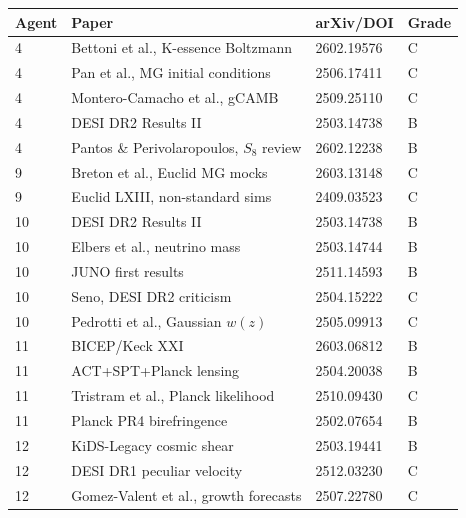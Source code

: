 \documentclass[11pt]{article}
\begin{document}
\begin{longtable}{p{}p{}p{}p{}}
\toprule
\textbf{Agent} & \textbf{Paper} & \textbf{arXiv/DOI} & \textbf{Grade} \\
\midrule
\endhead
4 & Bettoni et al., K-essence Boltzmann & 2602.19576 & C \\
4 & Pan et al., MG initial conditions & 2506.17411 & C \\
4 & Montero-Camacho et al., gCAMB & 2509.25110 & C \\
4 & DESI DR2 Results II & 2503.14738 & B \\
4 & Pantos \& Perivolaropoulos, $S_8$ review & 2602.12238 & B \\
\midrule
9 & Breton et al., Euclid MG mocks & 2603.13148 & C \\
9 & Euclid LXIII, non-standard sims & 2409.03523 & C \\
\midrule
10 & DESI DR2 Results II & 2503.14738 & B \\
10 & Elbers et al., neutrino mass & 2503.14744 & B \\
10 & JUNO first results & 2511.14593 & B \\
10 & Seno, DESI DR2 criticism & 2504.15222 & C \\
10 & Pedrotti et al., Gaussian $w(z)$ & 2505.09913 & C \\
\midrule
11 & BICEP/Keck XXI & 2603.06812 & B \\
11 & ACT+SPT+Planck lensing & 2504.20038 & B \\
11 & Tristram et al., Planck likelihood & 2510.09430 & C \\
11 & Planck PR4 birefringence & 2502.07654 & B \\
\midrule
12 & KiDS-Legacy cosmic shear & 2503.19441 & B \\
12 & DESI DR1 peculiar velocity & 2512.03230 & C \\
12 & Gomez-Valent et al., growth forecasts & 2507.22780 & C \\
\bottomrule
\end{longtable}
\end{document}
